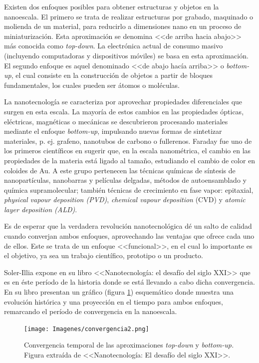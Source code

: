 		Existen dos enfoques posibles para obtener estructuras y objetos en la nanoescala. El primero se trata de realizar estructuras por grabado, maquinado o molienda de un material, para reducirlo a dimensiones nano en un proceso de miniaturización. Esta aproximación se denomina <<de arriba hacia abajo>> más conocida como \textit{top-down}. La electrónica actual de consumo masivo (incluyendo computadoras y dispositivos móviles) se basa en esta aproximación. El segundo enfoque es aquel denominado <<de abajo hacía arriba>> o \textit{bottom-up}, el cual consiste en la construcción de objetos a partir de bloques fundamentales, los cuales pueden ser átomos o moléculas. 

		La nanotecnología se caracteriza por aprovechar propiedades diferenciales que surgen en esta escala. La mayoría de estos cambios en las propiedades ópticas, eléctricas, magnéticas o mecánicas se descubrieron procesando materiales mediante el enfoque \textit{bottom-up}, impulsando nuevas formas de sintetizar materiales, p. ej. grafeno, nanotubos de carbono o fullerenos. Faraday fue uno de los primeros científicos en sugerir que, en la escala nanométrica, el cambio en las propiedades de la materia está ligado al tamaño, estudiando el cambio de color en coloides de Au\cite{faraday1857}. A este grupo pertenecen las técnicas químicas de síntesis de nanopartículas, nanobarras y películas delgadas, métodos de autoensamblado y química supramolecular; también técnicas de crecimiento en fase vapor: epitaxial, \textit{physical vapour deposition (PVD)}, \textit{chemical vapour deposition} (CVD) y \textit{atomic layer deposition (ALD)}.
			
		Es de esperar que la verdadera revolución nanotecnológica dé un salto de calidad cuando converjan ambos enfoques, aprovechando las ventajas que ofrece cada uno de ellos. Este se trata de un enfoque <<funcional>>, en el cual lo importante es el objetivo, ya sea un trabajo científico, prototipo o un producto.

		Soler-Illia expone en su libro <<Nanotecnología: el desafío del siglo XXI>>\cite{nanotecnologia-galo} que es en éste período de la historia donde se está llevando a cabo dicha convergencia. En su libro presentan un gráfico (figura \ref{fig:galo-convergencia}) esquemático donde muestra una evolución histórica y una proyección en el tiempo para ambos enfoques, remarcando el período de convergencia en la nanoescala.

			\begin{figure}[ht!]
 				\begin{center}
 				\texttt{[image: Imagenes/convergencia2.png]}
 				\caption[Convergencia \textit{top-down }y \textit{bottom-up.}]{Convergencia temporal de las aproximaciones \textit{top-down }y \textit{bottom-up.} Figura extraída de <<Nanotecnología: El desafío del siglo XXI>>.\cite{nanotecnologia-galo}}
 				\label{fig:galo-convergencia}
 		   	    \end{center}
 		   	    \end{figure}

